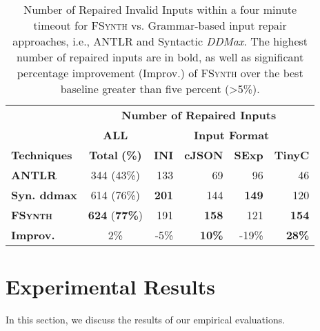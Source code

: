 \documentclass[sigconf,review,anonymous]{acmart}
\newcounter{todocounter}
\newcommand{\todo}[1]{\marginpar{$|$}\textcolor{red}{\stepcounter{todocounter}\footnote[\thetodocounter]{\textcolor{red}{\textbf{TODO }}\textit{#1}}}}
\renewcommand{\todo}[1]{}
\newcommand{\approach}{\textsc{FSynth}\xspace}
\newcommand{\ddmax}{\textit{DDMax}\xspace}
\begin{document}
\begin{table}[!tbp]\centering
\caption{Number of Repaired Invalid Inputs within a four minute timeout for \approach vs. Grammar-based input repair approaches, i.e.,  ANTLR and Syntactic \ddmax. The highest number of repaired inputs are in bold, as well as significant percentage improvement (Improv.) of \approach over the best baseline greater than five percent (>5\%). }
\begin{tabular}{|l | c | r  r  r  r |}
\hline
&  \multicolumn{5}{c|}{\textbf{Number of Repaired Inputs}}  \\
&  \multicolumn{1}{c|}{\textbf{ALL}} & \multicolumn{4}{c|}{\textbf{Input Format}}  \\
\textbf{Techniques} & \textbf{Total} \textbf{(\%)} & \textbf{INI} & \textbf{cJSON} & \textbf{SExp} & \textbf{TinyC} \\
\hline
\textbf{ANTLR} & 344 (43\%) & 133 & 69 & 96 &  46   \\
\textbf{Syn. ddmax} & 614 (76\%) & \textbf{201}  & 144  & \textbf{149}  & 120  \\ 	
\hline
\textbf{\approach}  & \textbf{624} (\textbf{77\%}) & 191 & \textbf{158}  & 121  &  \textbf{154} \\
\hline
\textbf{Improv.} &  2\%  & -5\% & \textbf{10\%} & -19\% & \textbf{28\%} \\
\hline
\end{tabular}
\label{tab:effectiveness-grammar}
\end{table}



\section{Experimental Results}
\label{sec:results}

In this section, we
discuss the %
results
of our empirical evaluations.

\end{document}
